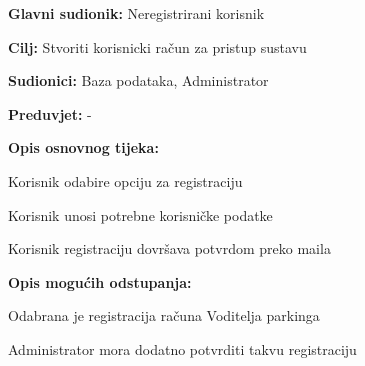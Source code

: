                         \noindent {}
					\begin{packed_item}
	
						\item \textbf{Glavni sudionik: }Neregistrirani korisnik
						\item  \textbf{Cilj:} Stvoriti korisnicki račun za pristup sustavu
						\item  \textbf{Sudionici:} Baza podataka, Administrator
						\item  \textbf{Preduvjet:} -
						\item  \textbf{Opis osnovnog tijeka:}
						
						\item[] \begin{packed_enum}
	
							\item Korisnik odabire opciju za registraciju
							\item Korisnik unosi potrebne korisničke podatke
							\item Korisnik registraciju dovršava potvrdom preko maila
							
						\end{packed_enum}
						
						\item  \textbf{Opis mogućih odstupanja:}
						
						\item[] \begin{packed_item}
	
							\item[2.a] Odabrana je registracija računa Voditelja parkinga
							\item[] \begin{packed_enum}
								
								\item Administrator mora dodatno potvrditi takvu registraciju
								
								
							\end{packed_enum}
	
							
						\end{packed_item}
					\end{packed_item}

